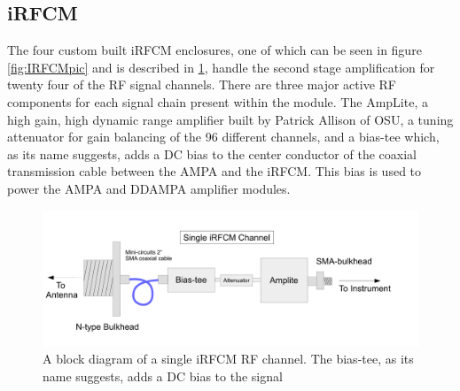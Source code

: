 	\subsection{iRFCM}
	The four custom built iRFCM enclosures, one of which can be seen in figure \ref{fig:IRFCMpic} and is described in \ref{fig:IRFCM}, handle the second stage amplification for twenty four of the RF signal channels.  There are three major active RF components for each signal chain present within the module. The AmpLite, a high gain, high dynamic range amplifier built by Patrick Allison of OSU, a tuning attenuator for gain balancing of the 96 different channels, and a bias-tee which, as its name suggests, adds a DC bias to the center conductor of the coaxial transmission cable between the AMPA and the iRFCM.  This bias is used to power the AMPA and DDAMPA amplifier modules.

	
\begin{figure}
\centering
	\includegraphics[width=\textwidth]{figures/IRFCM}
	\caption{A block diagram of a single iRFCM RF channel.  The bias-tee, as its name suggests, adds a DC bias to the signal }
	\label{fig:IRFCM}
\end{figure}
	
